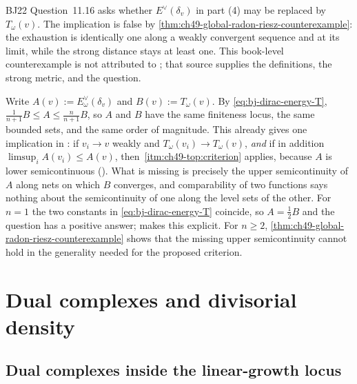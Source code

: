 \begin{remark}
\label{rem:ch49-open-question}
BJ22 Question~11.16 asks whether $E^\vee(\delta_v)$ in part (4) may be
replaced by $T_\omega(v)$.  The implication is false by
\cref{thm:ch49-global-radon-riesz-counterexample}: the exhaustion is
identically one along a weakly convergent sequence and at its limit, while
the strong distance stays at least one.  This book-level counterexample is
not attributed to \cite{BJ22}; that source supplies the definitions, the
strong metric, and the question.
\end{remark}

\begin{remark}
\label{rem:ch49-open-question-detail}
Write $A(v):=E^\vee_\omega(\delta_v)$ and $B(v):=T_\omega(v)$.  By
\eqref{eq:bj-dirac-energy-T}, $\tfrac1{n+1}B\le A\le\tfrac n{n+1}B$, so
$A$ and $B$ have the same finiteness locus, the same bounded sets, and
the same order of magnitude.  This already gives one implication in
: if $v_i\to v$ weakly and
$T_\omega(v_i)\to T_\omega(v)$, \emph{and} if in addition
$\limsup_iA(v_i)\le A(v)$, then
\,\cref{itm:ch49-top:criterion}
applies, because $A$ is lower semicontinuous
().  What is missing is precisely the
upper semicontinuity of $A$ along nets on which $B$ converges, and
comparability of two functions says nothing about the semicontinuity of
one along the level sets of the other.  For $n=1$ the two constants in
\eqref{eq:bj-dirac-energy-T} coincide, so $A=\tfrac12B$ and the question
has a positive answer;  makes this explicit.  For
$n\ge2$, \cref{thm:ch49-global-radon-riesz-counterexample} shows that
the missing upper semicontinuity cannot hold in the generality needed for
the proposed criterion.
\end{remark}

\section{Dual complexes and divisorial density}
\label{sec:ch49-density}

\subsection{Dual complexes inside the linear-growth locus}
\label{sec:ch49-dual-complexes}

